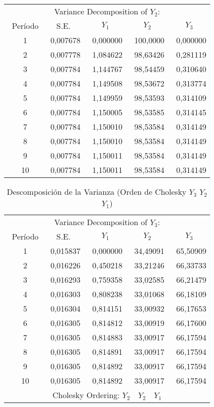 \begin{enumerate}
\begin{table}[H]
\centering
\begin{tabular}{ccccc}\hline\hline
\multicolumn{5}{c}{Variance Decomposition of $Y_{2}$:} \\ 
~Per\'{i}odo & S.E. & $Y_{1}$ & $Y_{2}$ & $Y_{3}$ \\ \hline\hline
~1 & ~0,007678 & ~0,000000 & ~100,0000 & ~0,000000 \\
~2 & ~0,007778 & ~1,084622 & ~98,63426 & ~0,281119 \\
~3 & ~0,007784 & ~1,144767 & ~98,54459 & ~0,310640 \\
~4 & ~0,007784 & ~1,149508 & ~98,53672 & ~0,313774 \\
~5 & ~0,007784 & ~1,149959 & ~98,53593 & ~0,314109 \\
~6 & ~0,007784 & ~1,150005 & ~98,53585 & ~0,314145 \\
~7 & ~0,007784 & ~1,150010 & ~98,53584 & ~0,314149 \\
~8 & ~0,007784 & ~1,150010 & ~98,53584 & ~0,314149 \\
~9 & ~0,007784 & ~1,150011 & ~98,53584 & ~0,314149 \\
~10& ~0,007784 & ~1,150011 & ~98,53584 & ~0,314149 \\ \hline\hline
\end{tabular}
\end{table}

\begin{table}[H]
\centering
\begin{tabular}{ccccc}\hline\hline
\multicolumn{5}{c}{Variance Decomposition of $Y_{3}$:} \\ 
~Per\'{i}odo & S.E. & $Y_{1}$ & $Y_{2}$ & $Y_{3}$ \\ \hline\hline
~1 & ~0,015837 & ~0,000000 & ~34,49091 & ~65,50909 \\
~2 & ~0,016226 & ~0,450218 & ~33,21246 & ~66,33733 \\
~3 & ~0,016293 & ~0,759358 & ~33,02585 & ~66,21479 \\
~4 & ~0,016303 & ~0,808238 & ~33,01068 & ~66,18109 \\
~5 & ~0,016304 & ~0,814151 & ~33,00932 & ~66,17653 \\
~6 & ~0,016305 & ~0,814812 & ~33,00919 & ~66,17600 \\
~7 & ~0,016305 & ~0,814883 & ~33,00917 & ~66,17594 \\
~8 & ~0,016305 & ~0,814891 & ~33,00917 & ~66,17594 \\ 
~9 & ~0,016305 & ~0,814892 & ~33,00917 & ~66,17594 \\
~10& ~0,016305 & ~0,814892 & ~33,00917 & ~66,17594 \\ \hline\hline
\multicolumn{5}{c}{Cholesky Ordering: $Y_{2} \quad Y_{2} \quad Y_{1}$} \\ \hline\hline
\end{tabular}
\caption{Descomposici\'{o}n de la Varianza (Orden de Cholesky $Y_{3}$ $Y_{2}$ $Y_{1}$)}
\label{tab29}
\end{table}


\end{enumerate}
